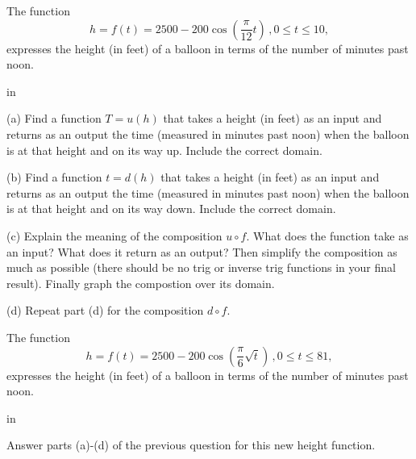 \documentclass{ximera}
\newcommand{\pskip}{\vskip 0.1 in}
\begin{document}
\begin{question} \label{Q25:InverseTrig}
The function
\[
  h = f(t) = 2500 - 200 \cos \left(  \frac{\pi}{12}t  \right) \, , 0\leq t \leq 10 ,
\]
expresses the height (in feet) of a balloon in terms of the number of minutes past noon.

\pskip

(a) Find a function $T=u(h)$ that takes a height (in feet) as an input and returns as an output the time (measured in minutes past noon) when the balloon is at that height and on its way up. Include the correct domain.

(b) Find a function $t=d(h)$ that  takes a height (in feet) as an input and returns as an output the time (measured in minutes past noon) when the balloon is at that height and on its way down. Include the correct domain.

(c) Explain the meaning of the composition $u\circ f$. What does the function take as an input? What does it return as an output? Then simplify the composition as much as possible (there should be no trig or inverse trig functions in your final result). Finally graph the compostion over its domain.

(d) Repeat part (d) for the composition $d\circ f$.

\end{question}



\begin{question} \label{Q28:InverseTrig}
The function
\[
  h = f(t) = 2500 - 200 \cos \left(  \frac{\pi}{6} \sqrt{t}  \right) \, , 0\leq t \leq 81 ,
\]
expresses the height (in feet) of a balloon in terms of the number of minutes past noon.

\pskip

Answer parts (a)-(d) of the previous question for this new height function.

\end{question}
\end{document}
